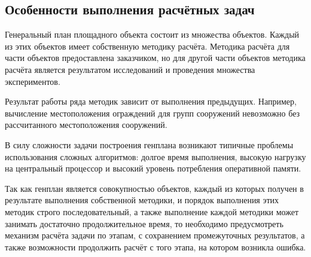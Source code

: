 \subsection*{\large{Особенности выполнения расчётных задач}}

Генеральный план площадного объекта состоит из множества объектов.
Каждый из этих объектов имеет собственную методику расчёта.
Методика расчёта для части объектов предоставлена заказчиком,
но для другой части объектов методика расчёта
является результатом исследований и проведения множества экспериментов.

Результат работы ряда методик зависит от выполнения предыдущих.
Например, вычисление местоположения ограждений для групп сооружений невозможно без рассчитанного
местоположения сооружений.

В силу сложности задачи построения генплана
возникают типичные проблемы использования сложных алгоритмов: долгое время выполнения,
высокую нагрузку на центральный процессор и высокий уровень потребления оперативной памяти.

Так как генплан является совокупностью объектов, каждый из которых получен в результате выполнения
собственной методики, и порядок выполнения этих методик строго последовательный, а также выполнение
каждой методики может занимать достаточно продолжительное время, то необходимо предусмотреть
механизм расчёта задачи по этапам, с сохранением промежуточных результатов,
а также возможности продолжить расчёт с того этапа, на котором возникла ошибка.
